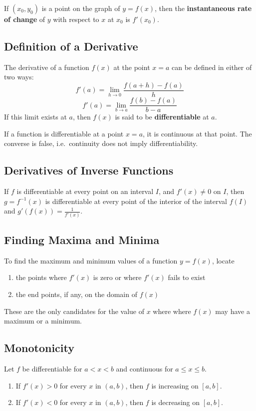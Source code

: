 \documentclass{artikel3}
\begin{document}
If $(x_0,y_0)$ is a point on the graph of $y=f(x)$, then the \textbf{instantaneous 
rate of change} of $y$ with respect to $x$ at $x_0$ is $f'(x_0)$.

\subsection{Definition of a Derivative}
The derivative of a function $f(x)$ at the point $x=a$ can be defined in either of two ways:
\[ f'(a)=\lim_{h \to 0}\frac{f(a+h)-f(a)}{h} \]
\[ f'(a)=\lim_{b \to a}\frac{f(b)-f(a)}{b-a} \]
If this limit exists at $a$, then $f(x)$ is said to be \textbf{differentiable} at $a$.

If a function is differentiable at a point $x=a$, it is continuous at that point.
The converse is false, i.e.\ continuity does not imply differentiability.

\subsection{Derivatives of Inverse Functions}\label{dinv}
If $f$ is differentiable at every point on an interval $I$, and $f'(x)\neq 0$
on $I$, then $g=f^{-1}(x)$ is differentiable at every point of the interior of
the interval $f(I)$ and $g'(f(x))=\frac{1}{f'(x)}$.

\subsection{Finding Maxima and Minima}
To find the maximum and minimum values of a function $y=f(x)$, locate
\begin{enumerate}
\item{the points where $f'(x)$ is zero or where $f'(x)$ fails to exist}
\item{the end points, if any, on the domain of $f(x)$}
\end{enumerate}
These are the only candidates for the value of $x$ where where $f(x)$ 
may have a maximum or a minimum.

\subsection{Monotonicity}
Let $f$ be differentiable for $a<x<b$ and continuous for $a\leq x\leq b$.
\begin{enumerate}
\item{If $f'(x)>0$ for every $x$ in $(a,b)$, then $f$ is increasing on $[a,b]$.}
\item{If $f'(x)<0$ for every $x$ in $(a,b)$, then $f$ is decreasing on $[a,b]$.}
\end{enumerate}
\end{document}
